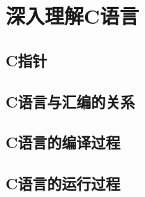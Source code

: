 \chapter{深入理解C语言}



\section{C指针}



\section{C语言与汇编的关系}




\section{C语言的编译过程}


\section{C语言的运行过程}








